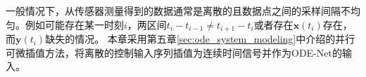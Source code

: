 一般情况下，从传感器测量得到的数据通常是离散的且数据点之间的采样间隔不均匀。例如可能存在某一时刻$i$，两区间$t_i-t_{i-1} \neq t_{i+1}-t_{i}$或者存在$\boldsymbol x(t_i)$存在，而$\boldsymbol y(t_i)$缺失的情况。
本章采用第五章\ref{sec:ode_system_modeling}中介绍的并行可微插值方法，将离散的控制输入序列插值为连续时间信号并作为ODE-Net的输入。



